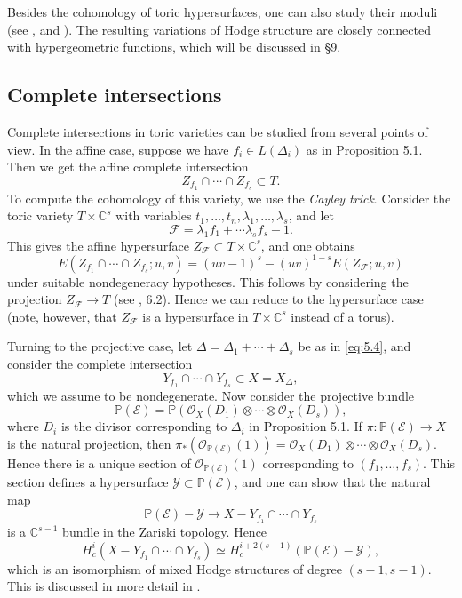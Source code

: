 \documentclass{amsart}
\theoremstyle{plain}
\theoremstyle{definition}
\begin{document}
	Besides the cohomology of toric hypersurfaces, one can also
study their moduli (see \cite{AGM2}, \cite{Bat4} and \cite{BC}).  The
resulting variations of Hodge structure are closely connected with
hypergeometric functions, which will be discussed in \S9.

	\subsection{Complete intersections} Complete
intersections in toric varieties can be studied from several points of
view.  In the affine case, suppose we have $f_i \in L(\Delta_i)$ as in
Proposition 5.1.  Then we get the affine complete intersection
\[
Z_{f_1}\cap\cdots\cap Z_{f_s} \subset T.
\]
To compute the cohomology of this variety, we use the {\it Cayley
trick\/}.  Consider the toric variety $T\times\mathbb{C}^s$ with variables
$t_1,\dots,t_n,\lambda_1,\dots,\lambda_s$, and let
\[
\mathcal{F} = \lambda_1 f_1 + \cdots \lambda_s f_s - 1.
\]
This gives the affine hypersurface $Z_{\mathcal{F}} \subset T\times\mathbb{C}^s$, and one obtains
\[
E(Z_{f_1}\cap\cdots\cap Z_{f_s};u,v) = (uv-1)^s - (uv)^{1-s}
E(Z_{\mathcal{F}};u,v)
\]
under suitable nondegeneracy hypotheses.  This follows by considering
the projection $Z_{\mathcal{F}} \to T$ (see \cite{DK}, 6.2).  Hence
we can reduce to the hypersurface case (note, however, that
$Z_{\mathcal{F}}$ is a hypersurface in $T\times\mathbb{C}^s$ instead of a
torus).

	Turning to the projective case, let $\Delta = \Delta_1 +
\cdots + \Delta_s$ be as in \eqref{eq:5.4}, and consider the complete
intersection 
\[
Y_{f_1} \cap\cdots\cap Y_{f_s} \subset X = X_\Delta,
\]
which we assume to be nondegenerate.  Now consider the projective
bundle 
\[
\mathbb{P}(\mathcal{E}) = \mathbb{P}(\mathcal{O}_X(D_1)\otimes\cdots\otimes\mathcal{O}_X(D_s)), 
\]
where $D_i$ is the divisor corresponding to $\Delta_i$ in Proposition
5.1.  If $\pi : \mathbb{P}(\mathcal{E}) \to X$ is the natural projection,
then $\pi_*(\mathcal{O}_{\mathbb{P}(\mathcal{E})}(1)) =
\mathcal{O}_X(D_1)\otimes\cdots\otimes\mathcal{O}_X(D_s)$.  Hence there is a
unique section of $\mathcal{O}_{\mathbb{P}(\mathcal{E})}(1)$ corresponding to
$(f_1,\dots,f_s)$.  This section defines a hypersurface $\mathcal{Y}
\subset \mathbb{P}(\mathcal{E})$, and one can show that the natural map
\[
\mathbb{P}(\mathcal{E}) - \mathcal{Y} \longrightarrow X - Y_{f_1} \cap\cdots\cap
Y_{f_s} 
\]
is a $\mathbb{C}^{s-1}$ bundle in the Zariski topology.  Hence
\[
H_c^i(X -  Y_{f_1} \cap\cdots\cap Y_{f_s}) \simeq
H_c^{i+2(s-1)}(\mathbb{P}(\mathcal{E}) - \mathcal{Y}), 
\]
which is an isomorphism of mixed Hodge structures of degree
$(s-1,s-1)$.  This is discussed in more detail in \cite{BB1}.  
\end{document}
